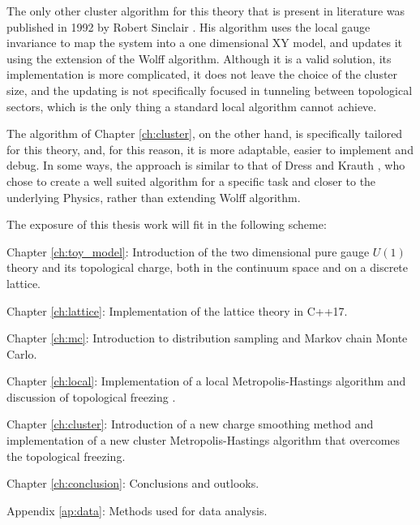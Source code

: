 The only other cluster algorithm for this theory that is present in literature was published in 1992 by Robert Sinclair \cite{sinclair:1992}.
His algorithm uses the local gauge invariance to map the system into a one dimensional XY model, and updates it using the extension of the Wolff algorithm.
Although it is a valid solution, its implementation is more complicated,
it does not leave the choice of the cluster size, and the updating is not specifically focused in tunneling between topological sectors,
which is the only thing a standard local algorithm cannot achieve. 

The algorithm of Chapter \ref{ch:cluster}, on the other hand, is specifically tailored for this theory, and,
for this reason, it is more adaptable, easier to implement and debug.
In some ways, the approach is similar to that of Dress and Krauth \cite{dress-krauth:1995},
who chose to create a well suited algorithm for a specific task and closer to the underlying Physics, rather than extending Wolff algorithm.\bigskip\bigskip

\begin{samepage}
\noindent
The exposure of this thesis work will fit in the following scheme:
\begin{description}
    \item{Chapter \ref{ch:toy_model}:}
        Introduction of the two dimensional pure gauge $U(1)$ theory and its topological charge,
        both in the continuum space and on a discrete lattice.
    \item{Chapter \ref{ch:lattice}:}
        Implementation of the lattice theory in C++17.
    \item{Chapter \ref{ch:mc}:}
        Introduction to distribution sampling and Markov chain Monte Carlo.
    \item{Chapter \ref{ch:local}:}
        Implementation of a local Metropolis-Hastings algorithm and discussion of topological freezing .
    \item{Chapter \ref{ch:cluster}:}
        Introduction of a new charge smoothing method and implementation of a new cluster Metropolis-Hastings algorithm that overcomes the topological freezing.
    \item{Chapter \ref{ch:conclusion}:}
        Conclusions and outlooks.\\
    \item{Appendix \ref{ap:data}:}
        Methods used for data analysis.
\end{description}
\end{samepage}

\endgroup

\vfill

